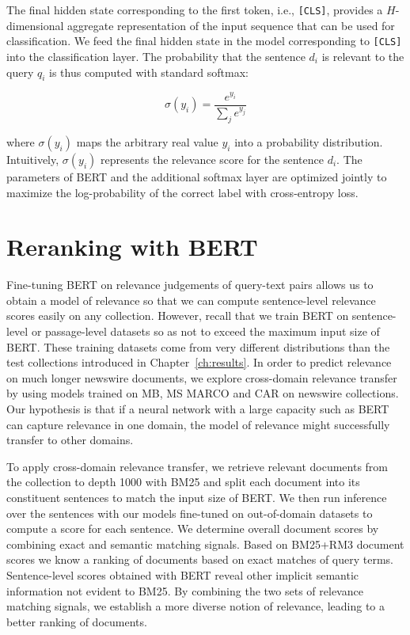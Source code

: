 The final hidden state corresponding to the first token, i.e., \texttt{[CLS]}, provides a $ H $-dimensional aggregate representation of the input sequence that can be used for classification.
We feed the final hidden state in the model corresponding to \texttt{[CLS]} into the classification layer.
The probability that the sentence $ d_i $ is relevant to the query $ q_i $ is thus computed with standard softmax:
 
\begin{equation}
\sigma (y_i) = \frac{e^{y_i}}{\sum_j e^{y_j}}
\end{equation}

\noindent where $\sigma (y_i)$ maps the arbitrary real value $ y_i $ into a probability distribution.
Intuitively, $\sigma (y_i)$ represents the relevance score for the sentence $ d_i $.
The parameters of BERT and the additional softmax layer are optimized jointly to maximize the log-probability of the correct label with cross-entropy loss.

\section{Reranking with BERT}


Fine-tuning BERT on relevance judgements of query-text pairs allows us to obtain a model of relevance so that we can compute sentence-level relevance scores easily on any collection.
However, recall that we train BERT on sentence-level or passage-level datasets so as not to exceed the maximum input size of BERT.
These training datasets come from very different distributions than the test collections introduced in Chapter~\ref{ch:results}.
In order to predict relevance on much longer newswire documents, we explore cross-domain relevance transfer by using models trained on MB, MS MARCO and CAR on newswire collections.
Our hypothesis is that if a neural network with a large capacity such as BERT can capture relevance in one domain, the model of relevance might successfully transfer to other domains.

To apply cross-domain relevance transfer, we retrieve relevant documents from the collection to depth 1000 with BM25 and split each document into its constituent sentences to match the input size of BERT.
We then run inference over the sentences with our models fine-tuned on out-of-domain datasets to compute a score for each sentence.
We determine overall document scores by combining exact and semantic matching signals.
Based on BM25+RM3 document scores we know a ranking of documents based on exact matches of query terms.
Sentence-level scores obtained with BERT reveal other implicit semantic information not evident to BM25.
By combining the two sets of relevance matching signals, we establish a more diverse notion of relevance, leading to a better ranking of documents.

